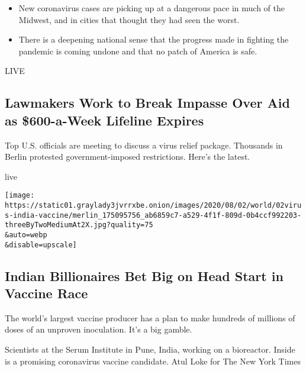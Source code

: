 \begin{itemize}
\tightlist
\item
  New coronavirus cases are picking up at a dangerous pace in much of
  the Midwest, and in cities that thought they had seen the worst.
\item
  There is a deepening national sense that the progress made in fighting
  the pandemic is coming undone and that no patch of America is safe.
\end{itemize}

\href{/2020/08/01/world/coronavirus-covid-19.html}{}

LIVE

\hypertarget{lawmakers-work-to-break-impasse-over-aid-as-600-a-week-lifeline-expires}{%
\subsection{Lawmakers Work to Break Impasse Over Aid as \$600-a-Week
Lifeline
Expires}\label{lawmakers-work-to-break-impasse-over-aid-as-600-a-week-lifeline-expires}}

Top U.S. officials are meeting to discuss a virus relief package.
Thousands in Berlin protested government-imposed restrictions. Here's
the latest.

live

\href{/2020/08/01/world/asia/coronavirus-vaccine-india.html}{}

\texttt{[image: https://static01.graylady3jvrrxbe.onion/images/2020/08/02/world/02virus-india-vaccine/merlin\_175095756\_ab6859c7-a529-4f1f-809d-0b4ccf992203-threeByTwoMediumAt2X.jpg?quality=75\\\&auto=webp\\\&disable=upscale]}

\href{/2020/08/01/world/asia/coronavirus-vaccine-india.html}{}

\hypertarget{indian-billionaires-bet-big-on-head-start-in-vaccine-race}{%
\subsection{Indian Billionaires Bet Big on Head Start in Vaccine
Race}\label{indian-billionaires-bet-big-on-head-start-in-vaccine-race}}

The world's largest vaccine producer has a plan to make hundreds of
millions of doses of an unproven inoculation. It's a big gamble.

\href{/2020/08/01/world/asia/coronavirus-vaccine-india.html}{}

Scientists at the Serum Institute in Pune, India, working on a
bioreactor. Inside is a promising coronavirus vaccine candidate. Atul
Loke for The New York Times

